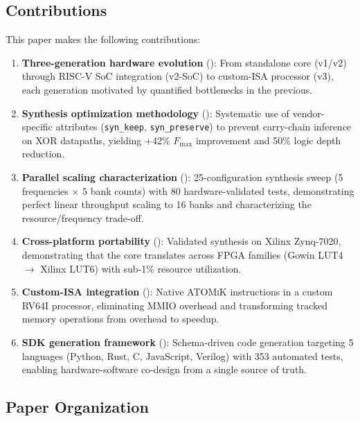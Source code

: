 \documentclass[11pt,letterpaper]{article}
\theoremstyle{plain}
\theoremstyle{definition}
\theoremstyle{remark}
\newcommand{\atomik}{\textsc{ATOMiK}}
\newcommand{\fmax}{$F_{\max}$}
\begin{document}
\subsection{Contributions}

This paper makes the following contributions:

\begin{enumerate}
    \item \textbf{Three-generation hardware evolution} (): From standalone core (v1/v2) through RISC-V SoC integration (v2-SoC) to custom-ISA processor (v3), each generation motivated by quantified bottlenecks in the previous.

    \item \textbf{Synthesis optimization methodology} (): Systematic use of vendor-specific attributes (\texttt{syn\_keep}, \texttt{syn\_preserve}) to prevent carry-chain inference on XOR datapaths, yielding +42\% \fmax{} improvement and 50\% logic depth reduction.

    \item \textbf{Parallel scaling characterization} (): 25-configuration synthesis sweep (5 frequencies $\times$ 5 bank counts) with 80 hardware-validated tests, demonstrating perfect linear throughput scaling to 16 banks and characterizing the resource/frequency trade-off.

    \item \textbf{Cross-platform portability} (): Validated synthesis on Xilinx Zynq-7020, demonstrating that the core translates across FPGA families (Gowin LUT4 $\rightarrow$ Xilinx LUT6) with sub-1\% resource utilization.

    \item \textbf{Custom-ISA integration} (): Native \atomik{} instructions in a custom RV64I processor, eliminating MMIO overhead and transforming tracked memory operations from overhead to speedup.

    \item \textbf{SDK generation framework} (): Schema-driven code generation targeting 5 languages (Python, Rust, C, JavaScript, Verilog) with 353 automated tests, enabling hardware-software co-design from a single source of truth.
\end{enumerate}

\subsection{Paper Organization}
\end{document}
